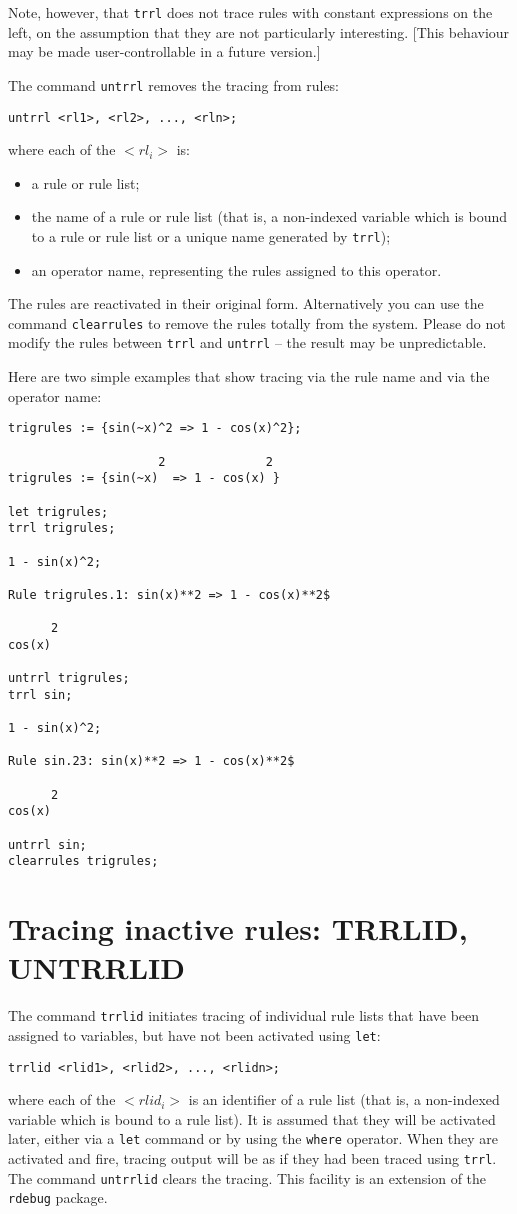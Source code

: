 \documentclass[11pt,a4paper]{article}
\newcommand{\rdebug}{\texttt{rdebug}}
\begin{document}
Note, however, that \texttt{trrl} does not trace rules with constant
expressions on the left, on the assumption that they are not
particularly interesting.  [This behaviour may be made
user-controllable in a future version.]

The command \texttt{untrrl} removes the tracing from rules:
\begin{verbatim}
untrrl <rl1>, <rl2>, ..., <rln>;
\end{verbatim}
where each of the $<rl_i>$ is:
\begin{itemize}
\item a rule or rule list;
\item the name of a rule or rule list (that is, a non-indexed variable
which is bound to a rule or rule list or a unique name generated by
\texttt{trrl});
\item an operator name, representing the rules assigned to this
operator.
\end{itemize}
The rules are reactivated in their original form.  Alternatively you
can use the command \texttt{clearrules} to remove the rules totally
from the system.  Please do not modify the rules between \texttt{trrl}
and \texttt{untrrl} -- the result may be unpredictable.

Here are two simple examples that show tracing via the rule name and
via the operator name:
\begin{verbatim}
trigrules := {sin(~x)^2 => 1 - cos(x)^2};

                     2              2
trigrules := {sin(~x)  => 1 - cos(x) }

let trigrules;
trrl trigrules;

1 - sin(x)^2;

Rule trigrules.1: sin(x)**2 => 1 - cos(x)**2$

      2
cos(x)

untrrl trigrules;
trrl sin;

1 - sin(x)^2;

Rule sin.23: sin(x)**2 => 1 - cos(x)**2$

      2
cos(x)

untrrl sin;
clearrules trigrules;
\end{verbatim}

\section{Tracing inactive rules: TRRLID, UNTRRLID}

The command \texttt{trrlid} initiates tracing of individual rule lists
that have been assigned to variables, but have not been activated
using \texttt{let}:
\begin{verbatim}
trrlid <rlid1>, <rlid2>, ..., <rlidn>;
\end{verbatim}
where each of the $<rlid_i>$ is an identifier of a rule list (that is,
a non-indexed variable which is bound to a rule list).  It is assumed
that they will be activated later, either via a \texttt{let} command
or by using the \texttt{where} operator.  When they are activated and
fire, tracing output will be as if they had been traced using
\texttt{trrl}.  The command \texttt{untrrlid} clears the tracing.
This facility is an extension of the \rdebug{} package.
\end{document}
